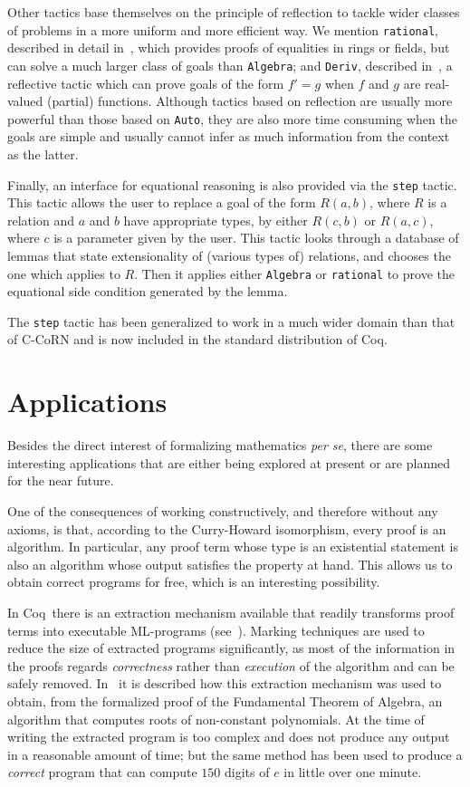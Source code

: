 \documentclass[runningheads]{llncs}
\newcommand{\ccorn}{\mbox{C-CoRN}}
\newcommand{\coq}{Coq}
\begin{document}
Other tactics base themselves on the principle of reflection to tackle wider
classes of problems in a more uniform and more efficient way.
We mention \texttt{rational}, described in detail in~\cite{geuvers2002}, which
provides proofs of equalities in rings or fields, but can solve a much larger
class of goals than \texttt{Algebra}; and \texttt{Deriv}, described
in~\cite{cfilipe2002}, a reflective tactic which can prove goals of the form
$f'=g$ when $f$ and $g$ are real-valued (partial) functions.
Although tactics based on reflection are usually more powerful than those based
on \texttt{Auto}, they are also more time consuming when the goals are simple
and usually cannot infer as much information from the context as the latter.

Finally, an interface for equational reasoning is also provided via the
\texttt{step} tactic.
This tactic allows the user to replace a goal of the form $R(a,b)$,
where $R$ is a relation and $a$ and $b$ have appropriate types, by
either $R(c,b)$ or $R(a,c)$, where $c$ is a parameter given by the
user.  This tactic looks through a database of lemmas that state
extensionality of (various types of) relations, and chooses the one
which applies to $R$. Then it applies either \texttt{Algebra} or
\texttt{rational} to prove the equational side condition generated by
the lemma.

The \texttt{step} tactic has been generalized to work in a
much wider domain than that of {\ccorn} and is now included in the
standard distribution of \coq.

\section{Applications\label{applications}}

Besides the direct interest of formalizing mathematics \emph{per se}, there
are some interesting applications that are either being explored at present
or are planned for the near future.

One of the consequences of working constructively, and therefore without any
axioms, is that, according to the Curry-Howard isomorphism, every proof is
an algorithm.
In particular, any proof term whose type is an existential statement is also
an algorithm whose output satisfies the property at hand.
This allows us to obtain correct programs for free, which is an interesting
possibility.

In \coq\ there is an extraction mechanism available that readily transforms
proof terms into executable ML-programs (see~\cite{letouzey2003}).
Marking techniques are used to reduce the size of extracted programs
significantly, as most of the information in the proofs regards
\emph{correctness} rather than \emph{execution} of the algorithm and
can be safely removed.
In~\cite{cfilipe2003} it is described how this extraction mechanism was used
to obtain, from the formalized proof of the Fundamental Theorem of Algebra,
an algorithm that computes roots of non-constant polynomials.
At the time of writing the extracted program is too complex and does not
produce any output in a reasonable amount of time; but the same method has
been used to produce a \emph{correct} program that can compute $150$ digits of
$e$ in little over one minute.
\end{document}

